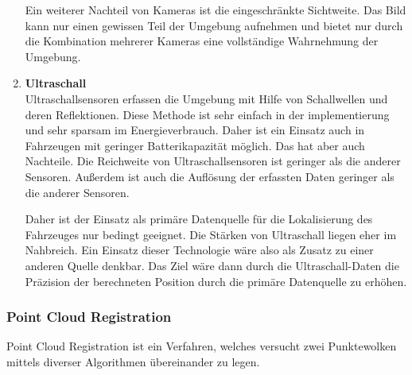 \begin{enumerate}[leftmargin=*]
    Ein weiterer Nachteil von Kameras ist die eingeschränkte Sichtweite. 
    Das Bild kann nur einen gewissen Teil der Umgebung aufnehmen und bietet nur durch die Kombination mehrerer Kameras eine vollständige Wahrnehmung der Umgebung.


    \item \textbf{Ultraschall} \\
    Ultraschallsensoren erfassen die Umgebung mit Hilfe von Schallwellen und deren Reflektionen. 
    Diese Methode ist sehr einfach in der implementierung und sehr sparsam im Energieverbrauch. 
    Daher ist ein Einsatz auch in Fahrzeugen mit geringer Batterikapazität möglich.
    Das hat aber auch Nachteile. 
    Die Reichweite von Ultraschallsensoren ist geringer als die anderer Sensoren. 
    Außerdem ist auch die Auflösung der erfassten Daten geringer als die anderer Sensoren.

    Daher ist der Einsatz als primäre Datenquelle für die Lokalisierung des Fahrzeuges nur bedingt geeignet.
    Die Stärken von Ultraschall liegen eher im Nahbreich.
    Ein Einsatz dieser Technologie wäre also als Zusatz zu einer anderen Quelle denkbar. 
    Das Ziel wäre dann durch die Ultraschall-Daten die Präzision der berechneten Position durch die primäre Datenquelle zu erhöhen. 
\end{enumerate}

\subsubsection{Point Cloud Registration}
\label{pcl}
Point Cloud Registration ist ein Verfahren, welches versucht zwei Punktewolken mittels diverser Algorithmen übereinander zu legen.

\newpage

